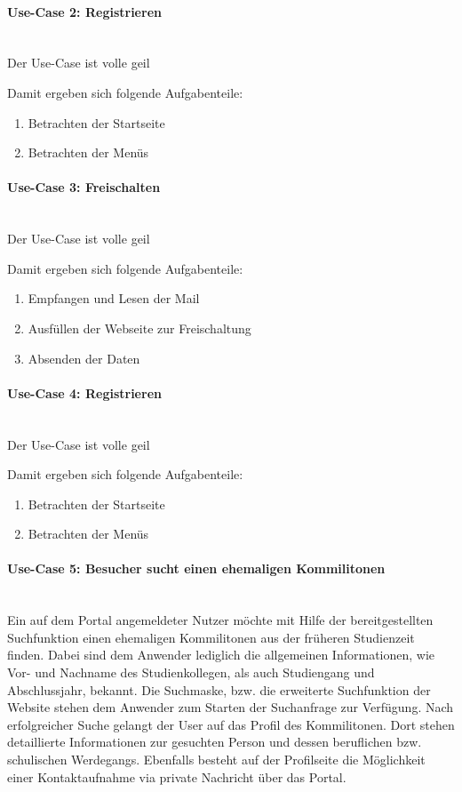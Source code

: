 \paragraph{Use-Case 2: Registrieren}\quad\\
Der Use-Case ist volle geil

Damit ergeben sich folgende Aufgabenteile:
\begin{enumerate}

		\item Betrachten der Startseite
		\item Betrachten der Menüs
\end{enumerate}

\paragraph{Use-Case 3: Freischalten}\quad\\
Der Use-Case ist volle geil

Damit ergeben sich folgende Aufgabenteile:
\begin{enumerate}

		\item Empfangen und Lesen der Mail
		\item Ausfüllen der Webseite zur Freischaltung
		\item Absenden der Daten
\end{enumerate}


\paragraph{Use-Case 4: Registrieren}\quad\\
Der Use-Case ist volle geil

Damit ergeben sich folgende Aufgabenteile:
\begin{enumerate}

		\item Betrachten der Startseite
		\item Betrachten der Menüs
\end{enumerate}


\paragraph{Use-Case 5: Besucher sucht einen ehemaligen Kommilitonen}\quad \\
Ein auf dem Portal angemeldeter Nutzer möchte mit Hilfe der bereitgestellten Suchfunktion einen ehemaligen Kommilitonen aus der früheren Studienzeit finden. Dabei sind dem Anwender lediglich die allgemeinen Informationen, wie Vor- und Nachname des Studienkollegen, als auch Studiengang und Abschlussjahr, bekannt. Die Suchmaske, bzw. die erweiterte Suchfunktion der Website stehen dem Anwender zum Starten der Suchanfrage zur Verfügung. Nach erfolgreicher Suche gelangt der User auf das Profil des Kommilitonen. Dort stehen detaillierte Informationen zur gesuchten Person und dessen beruflichen bzw. schulischen Werdegangs. Ebenfalls besteht auf der Profilseite die Möglichkeit einer Kontaktaufnahme via private Nachricht über das Portal.

